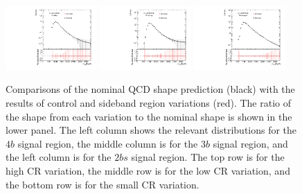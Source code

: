 \begin{figure}[htbp!]
\begin{center}
\includegraphics[width=0.31\textwidth,angle=-90]{figures/boosted/Syst_CRSB/CR_Small_compare_FourTag_qcd_hh.pdf}
\includegraphics[width=0.31\textwidth,angle=-90]{figures/boosted/Syst_CRSB/CR_Small_compare_ThreeTag_qcd_hh.pdf}
\includegraphics[width=0.31\textwidth,angle=-90]{figures/boosted/Syst_CRSB/CR_Small_compare_TwoTag_split_qcd_hh.pdf}
\end{center}
\caption{Comparisons of the nominal QCD shape prediction (black) with the results of control and sideband region variations (red). The ratio of the shape from each variation to the nominal shape is shown in the lower panel. The left column shows the relevant distributions for the $4b$ signal region, the middle column is for the $3b$ signal region, and the left column is for the $2bs$ signal region. The top row is for the high CR variation, the middle row is for the low CR variation, and the bottom row is for the small CR variation.}
\label{CRSB:QCDShapeSR-CR}
\end{figure}

